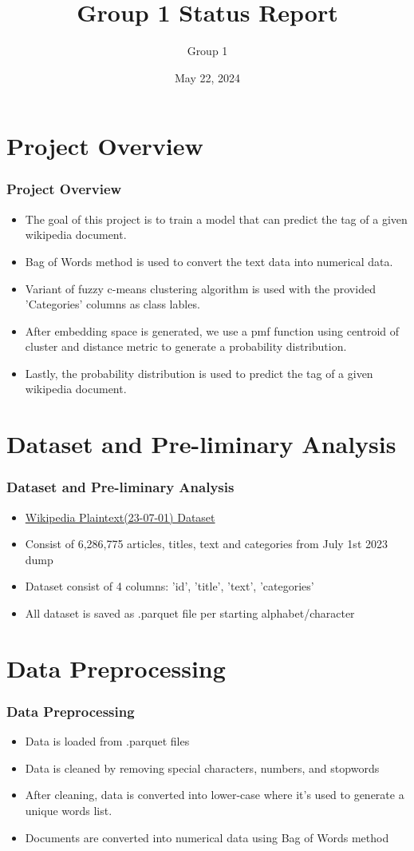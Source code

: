 \documentclass[
    10pt %
    16:9, %
]{beamer}
\title{Group 1 Status Report}
\subtitle{}
\author{Group 1}
\date[May 22, 2024]
 {May 22, 2024}
\begin{document}
\frame{\titlepage} %
\section[Outline]{}
\frame{\tableofcontents}

\section{Project Overview}
 
 
\frame %
{
  \frametitle{Project Overview}
  \begin{itemize}
    \item The goal of this project is to train a model that can predict the tag of a given wikipedia document.
    \item Bag of Words method is used to convert the text data into numerical data.
    \item Variant of fuzzy c-means clustering algorithm is used with the provided 'Categories' columns as class lables.
    \item After embedding space is generated, we use a pmf function using centroid of cluster and distance metric to generate a probability distribution.
    \item Lastly, the probability distribution is used to predict the tag of a given wikipedia document.
  \end{itemize}
}
\section{Dataset and Pre-liminary Analysis}
\frame
{
  \frametitle{Dataset and Pre-liminary Analysis}
  \begin{itemize}
    \item \href{https://www.kaggle.com/datasets/jjinho/wikipedia-20230701/data}{Wikipedia Plaintext(23-07-01) Dataset}
    \item Consist of 6,286,775 articles, titles, text and categories from July 1st 2023 dump
    \item Dataset consist of 4 columns: 'id', 'title', 'text', 'categories'
    \item All dataset is saved as .parquet file per starting alphabet/character
  \end{itemize}
}

\section{Data Preprocessing}
\frame
{
  \frametitle{Data Preprocessing}
  \begin{itemize}
    \item Data is loaded from .parquet files
    \item Data is cleaned by removing special characters, numbers, and stopwords
    \item After cleaning, data is converted into lower-case where it's used to generate a unique words list.
    \item Documents are converted into numerical data using Bag of Words method
  \end{itemize}
}
\end{document}
